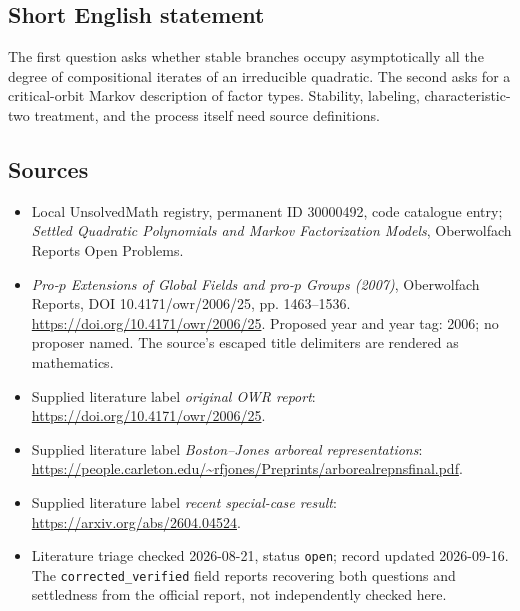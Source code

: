 \documentclass[11pt]{article}
\begin{document}
\subsection{Short English statement}
The first question asks whether stable branches occupy asymptotically all the degree of compositional iterates of an irreducible quadratic. The second asks for a critical-orbit Markov description of factor types. Stability, labeling, characteristic-two treatment, and the process itself need source definitions.
\subsection{Sources}
\begin{itemize}\item Local UnsolvedMath registry, permanent ID 30000492, code catalogue entry; \emph{Settled Quadratic Polynomials and Markov Factorization Models}, Oberwolfach Reports Open Problems.\item \emph{Pro-\(p\) Extensions of Global Fields and pro-\(p\) Groups (2007)}, Oberwolfach Reports, DOI 10.4171/owr/2006/25, pp. 1463--1536. \url{https://doi.org/10.4171/owr/2006/25}. Proposed year and year tag: 2006; no proposer named. The source's escaped title delimiters are rendered as mathematics.\item Supplied literature label \emph{original OWR report}: \url{https://doi.org/10.4171/owr/2006/25}.\item Supplied literature label \emph{Boston--Jones arboreal representations}: \url{https://people.carleton.edu/~rfjones/Preprints/arborealrepnsfinal.pdf}.\item Supplied literature label \emph{recent special-case result}: \url{https://arxiv.org/abs/2604.04524}.\item Literature triage checked 2026-08-21, status \texttt{open}; record updated 2026-09-16. The \texttt{corrected\_verified} field reports recovering both questions and settledness from the official report, not independently checked here.\end{itemize}
\end{document}
